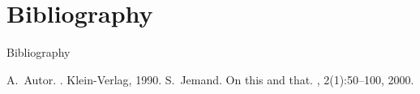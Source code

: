 \documentclass[14pt,xcolor=pdftex,dvipsnames,table]{beamer}
\begin{document}
\section{Bibliography}

\begin{frame}[allowframebreaks]{Bibliography}
  \begin{thebibliography}{10}    
  \beamertemplatebookbibitems
    A.~Autor.
    .
    \newblock Klein-Verlag, 1990.
  \beamertemplatearticlebibitems
    S.~Jemand.
    \newblock On this and that.
    , 2(1):50--100, 2000.
  \end{thebibliography}
\end{frame}
\end{document}
